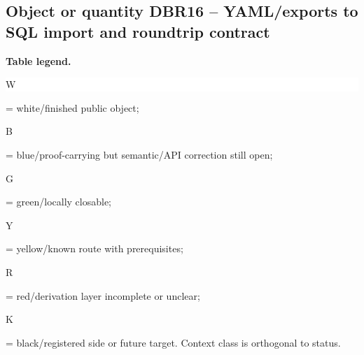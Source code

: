 \subsection*{Object or quantity DBR16 -- YAML/\allowbreak{}exports to SQL import and roundtrip contract}
\hypertarget{objproof:DBR16}{}
\par\smallskip\noindent\begin{minipage}{0.99\linewidth}\footnotesize\raggedright\textbf{Table legend.} \colorbox{white}{\strut W} = white/finished public object; \colorbox{cyan!20}{\strut B} = blue/proof-carrying but semantic/API correction still open; \colorbox{green!18}{\strut G} = green/locally closable; \colorbox{yellow!25}{\strut Y} = yellow/known route with prerequisites; \colorbox{red!20}{\strut R} = red/derivation layer incomplete or unclear; \colorbox{black!18}{\strut K} = black/registered side or future target. Context class is orthogonal to status.\end{minipage}\par\vspace{0.25em}
